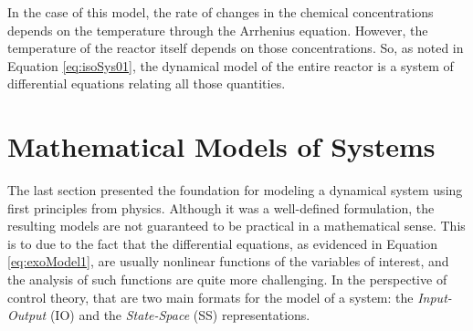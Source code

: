 \documentclass[a4paper,11pt]{book}
\numberwithin{figure}{chapter}
\numberwithin{equation}{chapter}
\numberwithin{table}{chapter}
\theoremstyle{definition}
\begin{document}
In the case of this model, the rate of changes in the chemical concentrations depends on the temperature through the Arrhenius equation. However, the temperature of the reactor itself depends on those concentrations. So, as noted in Equation \eqref{eq:isoSys01}, the dynamical model of the entire reactor is a system of differential equations relating all those quantities.


\section{Mathematical Models of Systems}

The last section presented the foundation for modeling a dynamical system using first principles from physics. Although it was a well-defined formulation, the resulting models are not guaranteed to be practical in a mathematical sense. This is to due to the fact that the differential equations, as evidenced in Equation \eqref{eq:exoModel1}, are usually nonlinear functions of the variables of interest, and the analysis of such functions are quite more challenging. In the perspective of control theory, that are two main formats for the model of a system: the \textit{Input-Output} (IO) and the \textit{State-Space} (SS) representations.
\end{document}
